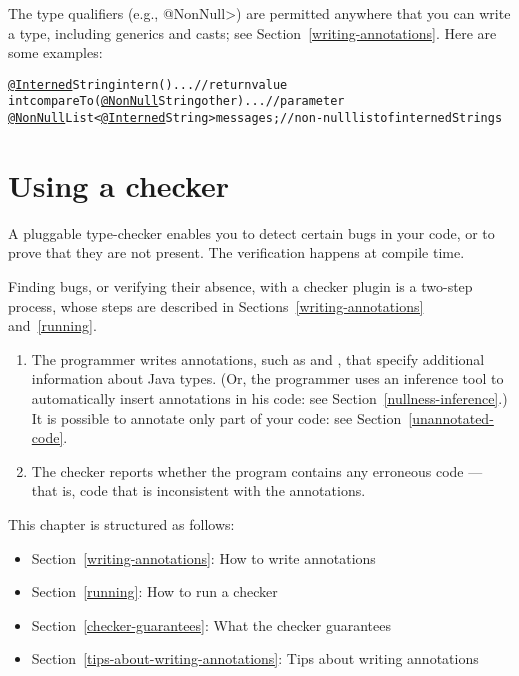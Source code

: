The type qualifiers (e.g., \<@NonNull>) are permitted anywhere
that you can write a type, including generics and casts; see
Section~\ref{writing-annotations}.  Here are some examples:

\begin{alltt}
  \underline{@Interned} String intern() \ttlcb{} ... \ttrcb{}             // return value
  int compareTo(\underline{@NonNull} String other) \ttlcb{} ... \ttrcb{}  // parameter
  \underline{@NonNull} List<\underline{@Interned} String> messages;     // non-null list of interned Strings
\end{alltt}


\htmlhr
\chapter{Using a checker\label{using-a-checker}}

A pluggable type-checker enables you to detect certain bugs in your code,
or to prove that they are not present.  The verification happens at compile
time.


Finding bugs, or verifying their absence, with a checker plugin is a two-step process, whose steps are
described in Sections~\ref{writing-annotations} and~\ref{running}.

\begin{enumerate}

\item The programmer writes annotations, such as  and
  , that specify additional information about Java types.
  (Or, the programmer uses an inference tool to automatically insert
  annotations in his code:  see Section~\ref{nullness-inference}.)
  It is possible to annotate only part of your code:  see
  Section~\ref{unannotated-code}.

\item The checker reports whether the program contains any erroneous code
  --- that is, code that is inconsistent with the annotations.

\end{enumerate}

This chapter is structured as follows:
\begin{itemize}
\item Section~\ref{writing-annotations}: How to write annotations
\item Section~\ref{running}:  How to run a checker
\item Section~\ref{checker-guarantees}: What the checker guarantees
\item Section~\ref{tips-about-writing-annotations}: Tips about writing annotations
\end{itemize}

